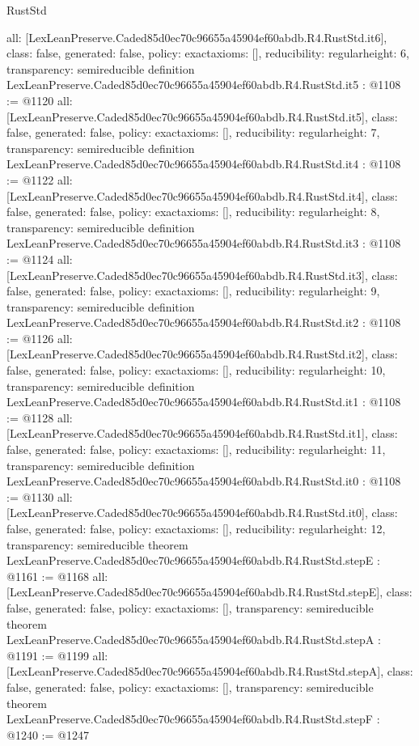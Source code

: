 \begin{lexlean}{RustStd}
\begin{coremodule}
{  all: [LexLeanPreserve.Caded85d0ec70c96655a45904ef60abdb.R4.RustStd.it6],
  class: false,
  generated: false,
  policy: exact{axioms: []},
  reducibility: regular{height: 6},
  transparency: semireducible
}
definition LexLeanPreserve.Caded85d0ec70c96655a45904ef60abdb.R4.RustStd.it5 : @1108 := @1120 {
  all: [LexLeanPreserve.Caded85d0ec70c96655a45904ef60abdb.R4.RustStd.it5],
  class: false,
  generated: false,
  policy: exact{axioms: []},
  reducibility: regular{height: 7},
  transparency: semireducible
}
definition LexLeanPreserve.Caded85d0ec70c96655a45904ef60abdb.R4.RustStd.it4 : @1108 := @1122 {
  all: [LexLeanPreserve.Caded85d0ec70c96655a45904ef60abdb.R4.RustStd.it4],
  class: false,
  generated: false,
  policy: exact{axioms: []},
  reducibility: regular{height: 8},
  transparency: semireducible
}
definition LexLeanPreserve.Caded85d0ec70c96655a45904ef60abdb.R4.RustStd.it3 : @1108 := @1124 {
  all: [LexLeanPreserve.Caded85d0ec70c96655a45904ef60abdb.R4.RustStd.it3],
  class: false,
  generated: false,
  policy: exact{axioms: []},
  reducibility: regular{height: 9},
  transparency: semireducible
}
definition LexLeanPreserve.Caded85d0ec70c96655a45904ef60abdb.R4.RustStd.it2 : @1108 := @1126 {
  all: [LexLeanPreserve.Caded85d0ec70c96655a45904ef60abdb.R4.RustStd.it2],
  class: false,
  generated: false,
  policy: exact{axioms: []},
  reducibility: regular{height: 10},
  transparency: semireducible
}
definition LexLeanPreserve.Caded85d0ec70c96655a45904ef60abdb.R4.RustStd.it1 : @1108 := @1128 {
  all: [LexLeanPreserve.Caded85d0ec70c96655a45904ef60abdb.R4.RustStd.it1],
  class: false,
  generated: false,
  policy: exact{axioms: []},
  reducibility: regular{height: 11},
  transparency: semireducible
}
definition LexLeanPreserve.Caded85d0ec70c96655a45904ef60abdb.R4.RustStd.it0 : @1108 := @1130 {
  all: [LexLeanPreserve.Caded85d0ec70c96655a45904ef60abdb.R4.RustStd.it0],
  class: false,
  generated: false,
  policy: exact{axioms: []},
  reducibility: regular{height: 12},
  transparency: semireducible
}
theorem LexLeanPreserve.Caded85d0ec70c96655a45904ef60abdb.R4.RustStd.stepE : @1161 := @1168 {
  all: [LexLeanPreserve.Caded85d0ec70c96655a45904ef60abdb.R4.RustStd.stepE],
  class: false,
  generated: false,
  policy: exact{axioms: []},
  transparency: semireducible
}
theorem LexLeanPreserve.Caded85d0ec70c96655a45904ef60abdb.R4.RustStd.stepA : @1191 := @1199 {
  all: [LexLeanPreserve.Caded85d0ec70c96655a45904ef60abdb.R4.RustStd.stepA],
  class: false,
  generated: false,
  policy: exact{axioms: []},
  transparency: semireducible
}
theorem LexLeanPreserve.Caded85d0ec70c96655a45904ef60abdb.R4.RustStd.stepF : @1240 := @1247 {
}
\end{coremodule}
\end{lexlean}
